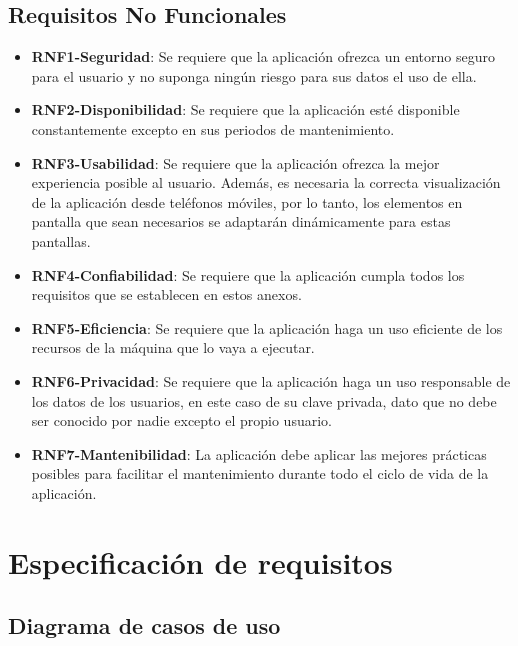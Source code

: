 \subsection{Requisitos No Funcionales}
\begin{itemize}
    \item \textbf{RNF1-Seguridad}: Se requiere que la aplicación ofrezca un entorno seguro para el usuario y no suponga ningún riesgo para sus datos el uso de ella.
    \item \textbf{RNF2-Disponibilidad}: Se requiere que la aplicación esté disponible constantemente excepto en sus periodos de mantenimiento.
    \item \textbf{RNF3-Usabilidad}: Se requiere que la aplicación ofrezca la mejor experiencia posible al usuario. Además, es necesaria la correcta visualización de la aplicación desde teléfonos móviles, por lo tanto, los elementos en pantalla que sean necesarios se adaptarán dinámicamente para estas pantallas.
    \item \textbf{RNF4-Confiabilidad}: Se requiere que la aplicación cumpla todos los requisitos que se establecen en estos anexos.
    \item \textbf{RNF5-Eficiencia}: Se requiere que la aplicación haga un uso eficiente de los recursos de la máquina que lo vaya a ejecutar.
    \item \textbf{RNF6-Privacidad}: Se requiere que la aplicación haga un uso responsable de los datos de los usuarios, en este caso de su clave privada, dato que no debe ser conocido por nadie excepto el propio usuario.
    \item \textbf{RNF7-Mantenibilidad}: La aplicación debe aplicar las mejores prácticas posibles para facilitar el mantenimiento durante todo el ciclo de vida de la aplicación.
\end{itemize}


\section{Especificación de requisitos}

\subsection{Diagrama de casos de uso}

